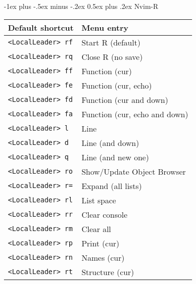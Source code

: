 \documentclass[10pt,landscape]{article}
\makeatletter
\renewcommand{\section}{\@startsection{section}{1}{0mm}%
                                {-1ex plus -.5ex minus -.2ex}%
                                {0.5ex plus .2ex}%
                                {\normalfont\large\bfseries}}
\makeatother
\begin{document}
\begin{multicols}{3}
\section{Nvim-R}
\begin{tabular}{@{}p{\the\MyLen}@{}p{\linewidth-\the\MyLen}@{}}
    \hline \hline
   Default shortcut  & Menu entry       \\
  \hline
   \verb|<LocalLeader> rf|       & Start R (default)\\
   \verb|<LocalLeader> rq|       & Close R (no save)\\
   \hline
   \verb|<LocalLeader> ff|       & Function (cur)                       \\
   \verb|<LocalLeader> fe|       & Function (cur, echo)                 \\
   \verb|<LocalLeader> fd|       & Function (cur and down)              \\
   \verb|<LocalLeader> fa|       & Function (cur, echo and down)        \\
   \hline
   \verb|<LocalLeader> l|        & Line                                  \\
   \verb|<LocalLeader> d|        & Line (and down)                       \\
   \verb|<LocalLeader> q|        & Line (and new one)                    \\
   \hline
   \verb|<LocalLeader> ro|       & Show/Update Object Browser        \\
   \verb|<LocalLeader> r=|       & Expand (all lists)                \\
   \hline
   \verb|<LocalLeader> rl|       & List space             \\
   \verb|<LocalLeader> rr|       & Clear console          \\
   \verb|<LocalLeader> rm|       & Clear all              \\
   \verb|<LocalLeader> rp|       & Print (cur)            \\
   \verb|<LocalLeader> rn|       & Names (cur)            \\
   \verb|<LocalLeader> rt|       & Structure (cur)        \\

\end{tabular}
\end{multicols}
\end{document}
